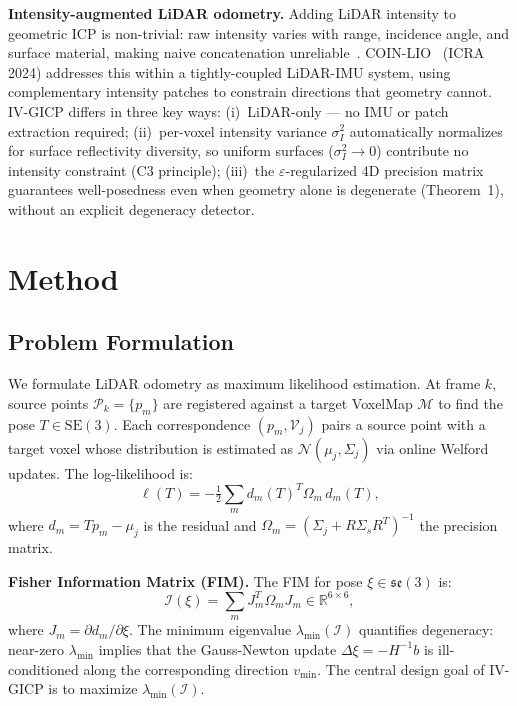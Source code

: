 \documentclass[letterpaper, 10pt, conference]{ieeeconf}
\newcommand{\vmin}{v_{\min}}
\newcommand{\FIM}{\mathcal{I}}
\newcommand{\SE}{\mathrm{SE}(3)}
\newcommand{\se}{\mathfrak{se}(3)}
\begin{document}
\textbf{Intensity-augmented LiDAR odometry.}
Adding LiDAR intensity to geometric ICP is non-trivial: raw intensity varies
with range, incidence angle, and surface material, making naive concatenation
unreliable~\cite{pfreundschuh2024coinlio}.
COIN-LIO~\cite{pfreundschuh2024coinlio} (ICRA 2024) addresses this within a
tightly-coupled LiDAR-IMU system, using complementary intensity patches to
constrain directions that geometry cannot.
IV-GICP differs in three key ways:
(i)~LiDAR-only --- no IMU or patch extraction required;
(ii)~per-voxel intensity variance $\sigma_I^2$ automatically normalizes for
surface reflectivity diversity, so uniform surfaces ($\sigma_I^2 \to 0$)
contribute no intensity constraint (C3 principle);
(iii)~the $\varepsilon$-regularized 4D precision matrix guarantees
well-posedness even when geometry alone is degenerate (Theorem~1),
without an explicit degeneracy detector.

\section{Method}\label{sec:method}

\subsection{Problem Formulation}\label{sec:formulation}

We formulate LiDAR odometry as maximum likelihood estimation.
At frame $k$, source points $\mathcal{P}_k = \{p_m\}$ are registered against
a target VoxelMap $\mathcal{M}$ to find the pose $T \in \SE$.
Each correspondence $(p_m, \mathcal{V}_j)$ pairs a source point with a target
voxel whose distribution is estimated as $\mathcal{N}(\mu_j, \Sigma_j)$ via
online Welford updates.
The log-likelihood is:
\begin{equation}
  \ell(T) = -\tfrac{1}{2}\sum_m d_m(T)^T \Omega_m\, d_m(T),
  \label{eq:loglik}
\end{equation}
where $d_m = Tp_m - \mu_j$ is the residual and
$\Omega_m = (\Sigma_j + R\Sigma_s R^T)^{-1}$ the precision matrix.

\textbf{Fisher Information Matrix (FIM).}
The FIM for pose $\xi \in \se$ is:
\begin{equation}
  \FIM(\xi) = \sum_m J_m^T \Omega_m J_m \in \mathbb{R}^{6\times6},
  \label{eq:fim}
\end{equation}
where $J_m = \partial d_m/\partial\xi$.
The minimum eigenvalue $\lambda_{\min}(\FIM)$ quantifies degeneracy:
near-zero $\lambda_{\min}$ implies that the Gauss-Newton update
$\Delta\xi = -H^{-1}b$ is ill-conditioned along the corresponding direction
$\vmin$.
The central design goal of IV-GICP is to maximize $\lambda_{\min}(\FIM)$.
\end{document}

